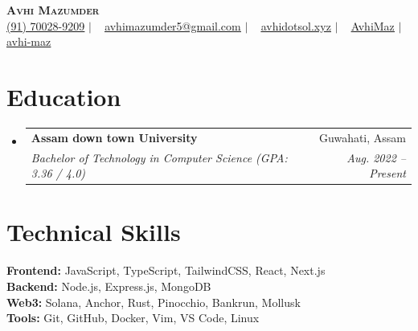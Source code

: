 \documentclass[letterpaper,11pt]{article}
\makeatletter
\newcommand{\resumeSubheading}[4]{
  \vspace{-2pt}\item
    \begin{tabular*}{0.97\textwidth}[t]{l@{\extracolsep{\fill}}r}
      \textbf{#1} & #2 \\
      \textit{\small#3} & \textit{\small #4} \\
    \end{tabular*}\vspace{-7pt}
}
\newcommand{\resumeSubHeadingListStart}{\begin{itemize}[leftmargin=0.15in, label={}]}
\newcommand{\resumeSubHeadingListEnd}{\end{itemize}}
\makeatother
\begin{document}
\begin{center}
  \textbf{\Huge \scshape Avhi Mazumder} \\ \vspace{5pt}
  \small
  \hspace{0.1em}
  \href{tel:917002892029}{\underline{(91) 70028-9209}} $|$ \
  \hspace{0.1em}
  \href{mailto:avhimazumder5@gmail.com}{\underline{avhimazumder5@gmail.com}} $|$ \ 
  \hspace{0.1em}
  \href{https://avhidotsol.xyz/}{\underline{avhidotsol.xyz}} $|$ \ 
  \hspace{0.1em}
  \href{https://github.com/AvhiMaz}{\underline{AvhiMaz}} $|$ \ 
  \hspace{0.1em}
  \href{https://www.linkedin.com/in/avhi-maz/}{\underline{avhi-maz}}
\end{center}

\section{Education}
  \resumeSubHeadingListStart

    \resumeSubheading
      {Assam down town University}{Guwahati, Assam}
      {Bachelor of Technology in Computer Science \newline\space(GPA: 3.36 / 4.0)}{Aug. 2022 -- Present}

  \resumeSubHeadingListEnd

\section{Technical Skills}
\begin{itemize}[leftmargin=0.15in, label={}]
  \small{\item{
    \textbf{Frontend:} JavaScript, TypeScript, TailwindCSS, React, Next.js \\
    \textbf{Backend:} Node.js, Express.js, MongoDB \\
    \textbf{Web3:} Solana, Anchor, Rust, Pinocchio, Bankrun, Mollusk \\
    \textbf{Tools:} Git, GitHub, Docker, Vim, VS Code, Linux
  }}
\end{itemize}
\end{document}
